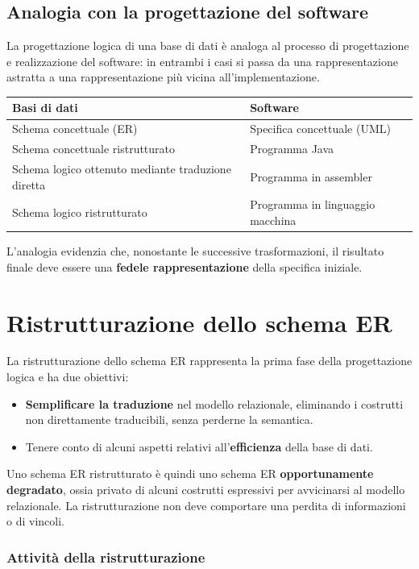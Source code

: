 \subsection*{Analogia con la progettazione del software}
La progettazione logica di una base di dati è analoga
al processo di progettazione e realizzazione del software:
in entrambi i casi si passa da una rappresentazione
astratta a una rappresentazione più vicina
all'implementazione.
\begin{center}
\renewcommand{\arraystretch}{1.5}
\begin{tabular}{|p{6cm}|p{6cm}|}
\hline
\textbf{Basi di dati} & \textbf{Software} \\
\hline
Schema concettuale (ER) &
Specifica concettuale (UML) \\
\hline
Schema concettuale ristrutturato &
Programma Java \\
\hline
Schema logico ottenuto mediante traduzione diretta &
Programma in assembler \\
\hline
Schema logico ristrutturato &
Programma in linguaggio macchina \\
\hline
\end{tabular}
\end{center}
\noindent
L'analogia evidenzia che, nonostante le successive
trasformazioni, il risultato finale deve essere una
\textbf{fedele rappresentazione} della specifica iniziale.

\section{Ristrutturazione dello schema ER}
La ristrutturazione dello schema ER rappresenta la prima
fase della progettazione logica e ha due obiettivi:

\begin{itemize}
    \item \textbf{Semplificare la traduzione} nel modello
    relazionale, eliminando i costrutti non direttamente
    traducibili, senza perderne la semantica.
    \item Tenere conto di alcuni aspetti relativi
    all'\textbf{efficienza} della base di dati.
\end{itemize}
\noindent
Uno schema ER ristrutturato è quindi uno schema ER
\textbf{opportunamente degradato}, ossia privato di alcuni
costrutti espressivi per avvicinarsi al modello relazionale.
La ristrutturazione non deve comportare una perdita
di informazioni o di vincoli.

\subsubsection{Attività della ristrutturazione}

